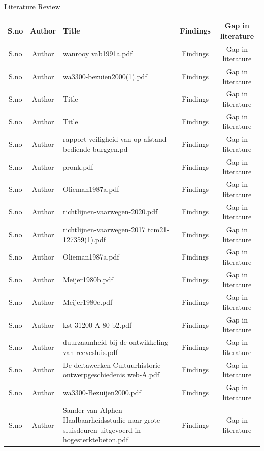 \begin{frame}{Literature Review}
	\begin{table}[htbp]
		\footnotesize
		
		\centering
		\begin{tabular}{|c|c|p{2in}|c|c|}\hline
			S.no&Author&Title&Findings&Gap in literature\\\hline
			S.no&Author&wanrooy \textunderscore vab1991a.pdf&Findings&Gap in literature\\\hline
			S.no&Author&wa3300-bezuien2000(1).pdf&Findings&Gap in literature\\\hline
			S.no&Author&Title&Findings&Gap in literature\\\hline
			S.no&Author&Title&Findings&Gap in literature\\\hline
			S.no&Author&rapport-veiligheid-van-op-afstand-bediende-burggen.pd&Findings&Gap in literature\\\hline
			S.no&Author&pronk.pdf&Findings&Gap in literature\\\hline
			S.no&Author&Olieman1987a.pdf&Findings&Gap in literature\\\hline
			S.no&Author&richtlijnen-vaarwegen-2020.pdf&Findings&Gap in literature\\\hline
			S.no&Author&richtlijnen-vaarwegen-2017 \textunderscore tcm21-127359(1).pdf&Findings&Gap in literature\\\hline
			S.no&Author&Olieman1987a.pdf&Findings&Gap in literature\\\hline
			S.no&Author&Meijer1980b.pdf&Findings&Gap in literature\\\hline
			S.no&Author&Meijer1980c.pdf&Findings&Gap in literature\\\hline
			S.no&Author&kst-31200-A-80-b2.pdf&Findings&Gap in literature\\\hline
			S.no&Author&duurzaamheid \textunderscore bij \textunderscore de \textunderscore ontwikkeling \textunderscore van \textunderscore reevesluis.pdf&Findings&Gap in literature\\\hline
			S.no&Author&De \textunderscore deltawerken \textunderscore Cultuurhistorie \textunderscore ontwerpgeschiedenis \textunderscore web-A.pdf&Findings&Gap in literature\\\hline
			S.no&Author&wa3300-Bezuijen2000.pdf&Findings&Gap in literature\\\hline
			S.no&Author&Sander van Alphen Haalbaarheidsstudie naar grote sluisdeuren uitgevoerd in hogesterktebeton.pdf&Findings&Gap in literature\\\hline

\end{tabular}
\end{table}
\end{frame}
